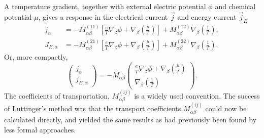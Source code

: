 A temperature gradient, together with external electric potential $\phi$ and chemical potential $\mu$, gives a response in the electrical current $\vec{j}$ and energy current $\vec{j}_E$~\cite{mahanManyparticlePhysics2000} 
\begin{align}
\label{eq:17}
  j_{\alpha} &= -M_{\alpha\beta}^{(11)} \left[
  \frac{e}{T} \nabla_{\beta} \phi + \nabla_{\beta} \left( \frac{\mu}{T} \right)
  \right]
  + M_{\alpha\beta}^{(12)} \nabla_{\beta} \left( \frac{1}{T} \right),\\
  J_{E,\alpha} &= -M_{\alpha\beta}^{(21)} \left[
\frac{e}{T}\nabla_{\beta}\phi + \nabla_{\beta} \left( \frac{\mu}{T} \right)
  \right] 
  + M_{\alpha\beta}^{(22)} \nabla_{\beta} \left( \frac{1}{T} \right).
\end{align}
Or, more compactly, 
\begin{equation}
  \begin{pmatrix}
    j_{\alpha } \\ j_{E,\alpha }
  \end{pmatrix}
  =
  -M_{\alpha \beta }
  \begin{pmatrix}
    \frac{e}{T}\nabla _{\beta }\phi  + \nabla _{\beta }\left( \frac{\mu}{T} \right) \\
    \nabla _{\beta }\left( \frac{1}{T} \right)
  \end{pmatrix}.
\end{equation}
The coefficients of transportation, $M_{\alpha \beta }^{(ij)}$ is a widely used convention.
The success of Luttinger's method was that the transport coefficients $M_{\alpha \beta }^{(ij)}$ could now be calculated directly, and yielded the same results as had previously been found by less formal approaches.


